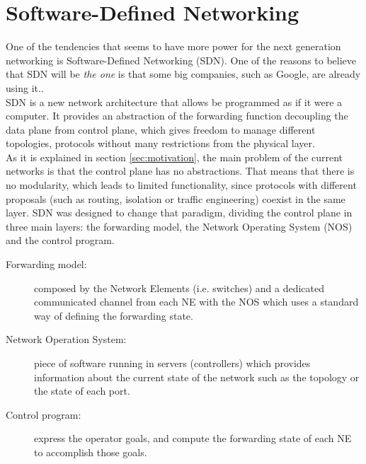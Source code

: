\section{Software-Defined Networking}
\label{sec:sdn}

One of the tendencies that seems to have more power for the next generation networking is Software-Defined Networking (SDN). One of the reasons to believe that SDN will be \emph{the one} is that some big companies, such as Google, are already using it.\cite{GoogleB4}\cite{GoogleWP}.\\


SDN is a new network architecture that allows be programmed as if it were a computer. It provides an abstraction of the forwarding function decoupling the data plane from control plane, which gives freedom to manage different topologies, protocols without many restrictions from the physical layer.\\

As it is explained in section \ref{sec:motivation}, the main problem of the current networks is that the control plane has no abstractions. That means that there is no modularity, which leads to limited functionality, since protocols with different proposals (such as routing, isolation or traffic engineering) coexist in the same layer. SDN was designed to change that paradigm, dividing the control plane in three main layers: the forwarding model, the Network Operating System (NOS) and the control program.\\

\begin{description}
\item[Forwarding model:] composed by the Network Elements (i.e. switches) and a dedicated communicated channel from each NE with the NOS which uses a standard way of defining the forwarding state.  
\item[Network Operation System:] piece of software running in servers (controllers) which provides information about the current state of the network such as the topology or the state of each port. 
\item[Control program:] express the operator goals, and compute the forwarding state of each NE to accomplish those goals.
\end{description}


